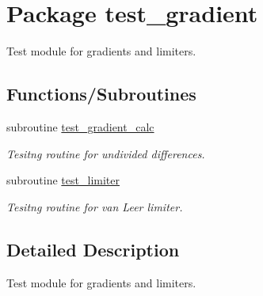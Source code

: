 \hypertarget{a00041}{
\section{Package test\_\-gradient}
\label{a00041}
}
Test module for gradients and limiters.  


\subsection*{Functions/Subroutines}
\begin{CompactItemize}
\item 
\hypertarget{a00041_ee6780a9a7e035894ddab56a1196cf0f}{
subroutine \hyperlink{a00041_ee6780a9a7e035894ddab56a1196cf0f}{test\_\-gradient\_\-calc}}
\label{a00041_ee6780a9a7e035894ddab56a1196cf0f}

\begin{CompactList}\small\item\em Tesitng routine for undivided differences. \item\end{CompactList}\item 
\hypertarget{a00041_ca178bd5a6926ed9fbd384a94e581cd5}{
subroutine \hyperlink{a00041_ca178bd5a6926ed9fbd384a94e581cd5}{test\_\-limiter}}
\label{a00041_ca178bd5a6926ed9fbd384a94e581cd5}

\begin{CompactList}\small\item\em Tesitng routine for van Leer limiter. \item\end{CompactList}\end{CompactItemize}


\subsection{Detailed Description}
Test module for gradients and limiters. 

